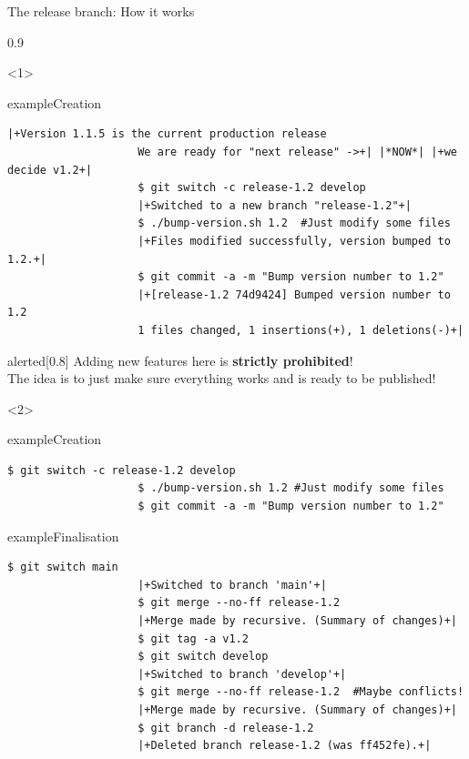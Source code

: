 \begin{frame}[fragile,c]{The release branch: How it works}
    \begin{overlayarea}{\textwidth}{0.9\textheight}
        \begin{onlyenv}<1>
            \begin{varblock}{example}{Creation}
                \begin{lstlisting}[style=MyBash]
                    |+Version 1.1.5 is the current production release
                    We are ready for "next release" ->+| |*NOW*| |+we decide v1.2+|
                    $ git switch -c release-1.2 develop
                    |+Switched to a new branch "release-1.2"+|
                    $ ./bump-version.sh 1.2  #Just modify some files
                    |+Files modified successfully, version bumped to 1.2.+|
                    $ git commit -a -m "Bump version number to 1.2"
                    |+[release-1.2 74d9424] Bumped version number to 1.2
                    1 files changed, 1 insertions(+), 1 deletions(-)+|
                \end{lstlisting}
            \end{varblock}
            \begin{varblock}{alerted}[0.8\textwidth]{}
                \alert{Adding new features here is \textbf{strictly prohibited}!}\\
                The idea is to just make sure everything works and is ready to be published!
            \end{varblock}
        \end{onlyenv}
        \begin{onlyenv}<2>
            \begin{varblock}{example}{Creation}
                \begin{lstlisting}[style=MyBash]
                    $ git switch -c release-1.2 develop
                    $ ./bump-version.sh 1.2 #Just modify some files
                    $ git commit -a -m "Bump version number to 1.2"
                \end{lstlisting}
            \end{varblock}
            \vspace{-2mm}
            \begin{varblock}{example}{Finalisation}
                \begin{lstlisting}[style=MyBash]
                    $ git switch main
                    |+Switched to branch 'main'+|
                    $ git merge --no-ff release-1.2
                    |+Merge made by recursive. (Summary of changes)+|
                    $ git tag -a v1.2
                    $ git switch develop
                    |+Switched to branch 'develop'+|
                    $ git merge --no-ff release-1.2  #Maybe conflicts!
                    |+Merge made by recursive. (Summary of changes)+|
                    $ git branch -d release-1.2
                    |+Deleted branch release-1.2 (was ff452fe).+|
                \end{lstlisting}
            \end{varblock}
        \end{onlyenv}
    \end{overlayarea}
\end{frame}
